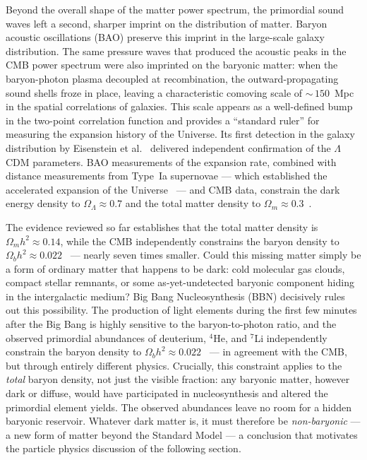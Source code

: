 Beyond the overall shape of the matter power spectrum, the primordial sound waves left a second, sharper imprint on the distribution of matter.
Baryon acoustic oscillations (BAO) preserve this imprint in the large-scale galaxy distribution.
The same pressure waves that produced the acoustic peaks in the CMB power spectrum were also imprinted on the baryonic matter: when the baryon-photon plasma decoupled at recombination, the outward-propagating sound shells froze in place, leaving a characteristic comoving scale of ${\sim}\,150$~Mpc in the spatial correlations of galaxies.
This scale appears as a well-defined bump in the two-point correlation function and provides a ``standard ruler'' for measuring the expansion history of the Universe.
Its first detection in the galaxy distribution by Eisenstein et al.~\cite{SDSS:2005xqv} delivered independent confirmation of the $\Lambda$CDM parameters.
BAO measurements of the expansion rate, combined with distance measurements from Type~Ia supernovae --- which established the accelerated expansion of the Universe~\cite{SupernovaSearchTeam:1998fmf,SupernovaCosmologyProject:1998vns} --- and CMB data, constrain the dark energy density to $\Omega_\Lambda \approx 0.7$ and the total matter density to $\Omega_m \approx 0.3$~\cite{Aghanim:2018eyx,Pan-STARRS1:2017jku}.

The evidence reviewed so far establishes that the total matter density is $\Omega_m h^2 \approx 0.14$, while the CMB independently constrains the baryon density to $\Omega_b h^2 \approx 0.022$~\cite{Aghanim:2018eyx} --- nearly seven times smaller.
Could this missing matter simply be a form of ordinary matter that happens to be dark: cold molecular gas clouds, compact stellar remnants, or some as-yet-undetected baryonic component hiding in the intergalactic medium?
Big Bang Nucleosynthesis (BBN) decisively rules out this possibility.
The production of light elements during the first few minutes after the Big Bang is highly sensitive to the baryon-to-photon ratio, and the observed primordial abundances of deuterium, $^4$He, and $^7$Li independently constrain the baryon density to $\Omega_b h^2 \approx 0.022$~\cite{Iocco:2008va,ParticleDataGroup:2022pth} --- in agreement with the CMB, but through entirely different physics.
Crucially, this constraint applies to the \emph{total} baryon density, not just the visible fraction: any baryonic matter, however dark or diffuse, would have participated in nucleosynthesis and altered the primordial element yields.
The observed abundances leave no room for a hidden baryonic reservoir.
Whatever dark matter is, it must therefore be \emph{non-baryonic} --- a new form of matter beyond the Standard Model --- a conclusion that motivates the particle physics discussion of the following section.

